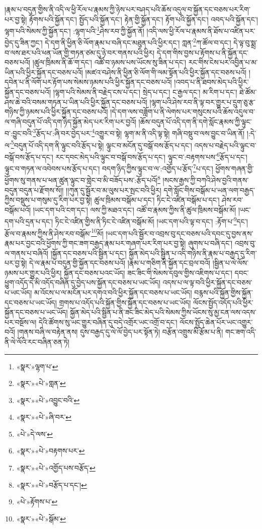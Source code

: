།རྣམ་པ་བདུན་གྱིས་ནི་འདི་ལ་ཕྱི་རོལ་པ་རྣམས་ཀྱི་ཉེས་པར་བཤད་པའི་ཆོས་འདུལ་བ་སྐྱོན་དང་བཅས་པར་རིག་པར་བྱ་སྟེ། རྟོགས་པའི་སྐྱོན་དང་། སྤྱོད་པའི་སྐྱོན་དང་། རྟེན་གྱི་སྐྱོན་དང་། རྟོག་པའི་སྐྱོན་དང་། འབད་པའི་སྐྱོན་དང་། ལྷག་པའི་སེམས་ཀྱི་སྐྱོན་དང་། :ལྷག་པའི་\footnote{«སྣར་»ལྷག་པ་}ཤེས་རབ་ཀྱི་སྐྱོན་ནོ། །འདི་ལས་ཕྱི་རོལ་པ་རྣམས་ནི་ཐོས་པ་འཛིན་པར་བྱེད་དུ་ཟིན་ཀྱང་། དེ་དག་ནི་ཕྱིན་ཅི་ལོག་རྣམ་པ་བཞི་དང་མཐུན་པའི་ཕྱིར་དང་། ཀླན་\footnote{«སྣར་»«པེ་»གླན་}ཀ་ཚོལ་བ་དང་། དེ་ལྟ་བུ་སྨྲ་བ་ལས་ཐར་པའི་ཕན་ཡོན་གྱི་གཏན་ཙམ་དུ་ཉེ་བར་གནས་པའི་ཕྱིར། དེ་དག་གིས་བྱས་པ་རྟོགས་པ་ནི་སྐྱོན་དང་བཅས་པའོ། །ཚུལ་ཁྲིམས་ནི་ཆོ་ག་དང་། འཚོ་བ་ཉམས་པས་ཡོངས་སུ་ཟིན་པ་དང་། རང་གིས་ངེས་པར་འབྱིན་པ་མ་ཡིན་པའི་ཕྱིར་སྐྱོན་དང་བཅས་པའོ། །མཛའ་བཤེས་ནི་ཕྱིན་ཅི་ལོག་གི་ལམ་སྟོན་པའི་ཕྱིར་སྐྱོན་དང་བཅས་པའོ། །དབེན་པ་ནི་ལོག་པར་རྟོག་པས་སེམས་ཉམས་པའི་ཕྱིར་སྐྱོན་དང་བཅས་པའོ། །འབད་པ་ནི་ཐབས་མེད་པའི་ཕྱིར་སྐྱོན་དང་བཅས་པའོ། །ལྷག་པའི་སེམས་ནི་བརྗེད་ངས་པ་དང་། སྲེད་པ་དང་། ང་རྒྱལ་དང་། མ་རིག་པ་དང་། ཐེ་ཚོམ་ཤས་ཆེ་བའི་བསམ་གཏན་པ་ཡིན་པའི་ཕྱིར་སྐྱོན་དང་བཅས་པའོ། །ལྷག་པའི་ཤེས་རབ་ནི་ལྟ་བར་གྱུར་པ་དྲུག་ཅུ་རྩ་གཉིས་ཀྱི་ཉམས་པའི་ཕྱིར་སྐྱོན་དང་བཅས་པའོ། །དེ་དག་ལས་བཟློག་པ་ནི་ལེགས་པར་གསུངས་པའི་ཆོས་འདུལ་བ་ལ་གཞི་བདུན་པོ་འདི་དག་ཉིད་སྐྱོན་མེད་པར་རིག་པར་བྱའོ། །ཆོས་བདུན་པོ་འདི་དག་ནི་དགེ་སློང་རྣམས་ཀྱི་ལྟུང་བ་:བྱུང་བའི་\footnote{«སྣར་»«པེ་»འབྱུང་བའི་}རྩོད་པ་:ཞི་བར་བྱེད་པར་\footnote{«སྣར་»«པེ་»ཞི་བར་}འགྱུར་བ་སྟེ། ལྷག་མ་ནི་འདི་ལྟ་སྟེ། གཞི་བསྡུ་བ་ལས་བྱུང་བ་ཡིན་ནོ། །:དེ་ལ་\footnote{«པེ་»དེ་ལས་}བདུན་པོ་འདི་དག་ནི་ལྟུང་བའི་རྩོད་པ་སྟེ། ལྟུང་བ་མངོན་དུ་བསྒོ་བས་རྩོད་པ་དང་། འདས་པ་བརྗེད་པའི་ལྟུང་བ་བསྒོ་བས་རྩོད་པ་དང་། རང་དབང་མེད་པའི་ལྟུང་བ་བསྒོ་བས་རྩོད་པ་དང་། ལྟུང་བ་:བརྟགས་པས་\footnote{«སྣར་»«པེ་»བརྟགས་པར་}རྩོད་པ་དང་། ལྟུང་བ་གཏན་ལ་འབེབས་པས་རྩོད་པ་དང་། བདག་ཉིད་ཀྱིས་ལྟུང་བ་ལ་:འགྱོད་པ་རྩོད་\footnote{«སྣར་»«པེ་»འགྱོད་པས་བརྩོད་}པ་དང་། ཕྱོགས་གཞན་གྱི་ཕྱོགས་སུ་གནས་པ་ཕན་ཚུན་ལྟུང་བ་གླེང་བ་མི་བཟོད་པས་:རྩོད་པའོ།\footnote{«སྣར་»«པེ་»བརྩོད་པ་དང་།} །སངས་རྒྱས་ཀྱི་བཀའི་ཤེས་བྱའི་གནས་བདུན་བདུན་པ་རྫོགས་སོ།། །།ཀུན་དུ་སྦྱོར་བ་མ་ལུས་པར་སྤང་བའི་ཕྱིར། དགེ་སློང་གིས་བསྒོམ་པ་ཡན་ལག་བརྒྱད་ཀྱིས་བསྡུས་པ་གསུམ་དུ་རིག་པར་བྱ་སྟེ། ཚུལ་ཁྲིམས་བསྒོམ་པ་དང་། ཏིང་ངེ་འཛིན་བསྒོམ་པ་དང་། ཤེས་རབ་བསྒོམ་པའོ། །ཡང་དག་པའི་ངག་དང་། ལས་ཀྱི་མཐའ་དང་། འཚོ་བ་རྣམས་ཀྱིས་ནི་ཚུལ་ཁྲིམས་བསྒོམ་མོ། །ཡང་དག་པའི་དྲན་པ་དང་། ཏིང་ངེ་འཛིན་གྱིས་ནི་ཏིང་ངེ་འཛིན་བསྒོམ་མོ། །ཡང་དག་པའི་ལྟ་བ་དང་། :རྟོག་པ་\footnote{«པེ་»རྟོགས་པ་}དང་། རྩོལ་བ་རྣམས་ཀྱིས་ནི་ཤེས་རབ་བསྒོམ་\footnote{«སྣར་»«པེ་»སྒོམ་}མོ། །ཡང་དག་པའི་སྦྱོར་བ་འབྲས་བུ་དང་བཅས་པའི་དབང་དུ་བྱས་ནས་རྣམ་པར་བྱང་བའི་ཕྱོགས་ཀྱི་གང་ཟག་བརྒྱད་རྣམ་པར་གཞག་པར་རིག་པར་བྱ་སྟེ། ཞུགས་པ་བཞི་དང་། འབྲས་བུ་ལ་གནས་པ་བཞིའོ། །སྐྱོན་དང་བཅས་པའི་སྦྱིན་པ་དང་། སྐྱོན་མེད་པའི་སྦྱིན་པ་འདི་གཉིས་ནི་རྣམ་པ་བརྒྱད་དུ་རིག་པར་བྱ་སྟེ། དེ་ལ་རྣམ་པ་བདུན་གྱི་སྐྱོན་དང་བཅས་པའོ། །རྣམ་པ་གཅིག་ནི་སྐྱོན་དང་བྲལ་བའོ། །སྦྱིན་པ་ལེ་ལོས་ཉམས་པར་གྱུར་པའི་ཕྱིར། སྐྱོན་དང་བཅས་པའང་ཡོད། ཟང་ཟིང་གི་སེམས་དབུལ་གྱིས་འཇིགས་པ་དང་། དབང་ཕྱུག་འདོད་དེ་མི་འདོད་བཞིན་དུ་བྱེད་པས་སྐྱོན་དང་བཅས་པ་ཡང་ཡོད། འདས་པ་ལ་ལྟ་བའི་ཕྱིར་སྐྱོན་དང་བཅས་པ་ཡང་ཡོད། མ་འོངས་པ་ལ་མངོན་པར་དགའ་བའི་ཕྱིར་སྐྱོན་དང་བཅས་པ་ཡང་ཡོད། བརྙས་པའི་སྐྱོན་གྱིས་སྐྱོན་དང་བཅས་པ་ཡང་ཡོད། གྲགས་པ་འདོད་པའི་སྐྱོན་གྱིས་སྐྱོན་དང་བཅས་པ་ཡང་ཡོད། ལོངས་སྤྱོད་འདོད་པའི་ཕྱིར་སྐྱོན་དང་བཅས་པ་ཡང་ཡོད། སྐྱོན་མེད་པའི་སྦྱིན་པ་ནི་ཟང་ཟིང་མེད་པའི་སེམས་ཀྱིས་ཡོངས་སུ་མྱ་ངན་ལས་འདས་པར་བསྔོས་ལ། དེའི་ཚོགས་སུ་ཡང་གྱུར་བཞིན་དུ་བདེ་འགྲོར་ཡང་འགྲོ་བ་དང་། ལོངས་སྤྱོད་ཆེན་པོར་ཡང་འགྱུར་བའོ། །གནས་བཞི་ལ་བརྟེན་ནས། དུས་བརྒྱད་དུ་ལེ་ལོ་བྱེད་པར་སྟོན་ཏེ། བརྩོན་འགྲུས་མི་རྩོམ་པ་ནི། གང་ཟག་འདི་ནི་ལེ་ལོའི་རང་བཞིན་ཅན་ཏེ། 